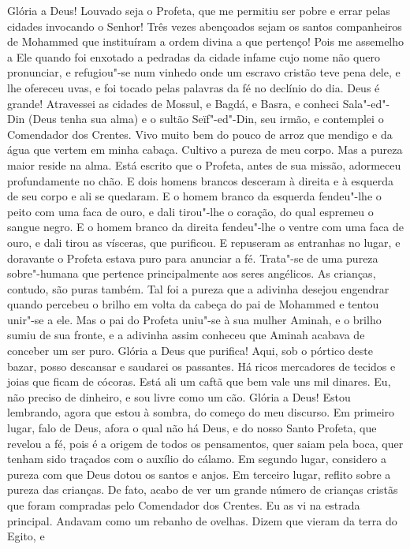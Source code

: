 Glória a Deus!  Louvado seja o Profeta, que me permitiu ser pobre e errar
pelas cidades invocando o Senhor! Três vezes abençoados sejam os santos
companheiros de Mohammed que instituíram a ordem divina a que pertenço!
Pois me assemelho a Ele quando foi enxotado a pedradas da cidade infame
cujo nome não quero pronunciar, e refugiou"-se num vinhedo onde um escravo
cristão teve pena dele, e lhe ofereceu uvas, e foi tocado pelas palavras
da fé no declínio do dia. Deus é grande! Atravessei as cidades de Mossul,
e Bagdá, e Basra, e conheci Sala"-ed"-Din (Deus tenha sua alma) e o sultão
Seïf"-ed"-Din, seu irmão, e contemplei o Comendador dos Crentes. Vivo muito
bem do pouco de arroz que mendigo e da água que vertem em minha cabaça.
Cultivo a pureza de meu corpo. Mas a pureza maior reside na alma. Está
escrito que o Profeta, antes de sua missão, adormeceu profundamente no
chão. E dois homens brancos desceram à direita e à esquerda de seu corpo e
ali se quedaram. E o homem branco da esquerda fendeu"-lhe o peito com uma
faca de ouro, e dali tirou"-lhe o coração, do qual espremeu o sangue negro.
E o homem branco da direita fendeu"-lhe o ventre com uma faca de ouro, e
dali tirou as vísceras, que purificou. E repuseram as entranhas no lugar, e
doravante o Profeta estava puro para anunciar a fé. Trata"-se de uma pureza
sobre"-humana que pertence principalmente aos seres angélicos. As crianças,
contudo, são puras também. Tal foi a pureza que a adivinha desejou
engendrar quando percebeu o brilho em volta da cabeça do pai de Mohammed e
tentou unir"-se a ele. Mas o pai do Profeta uniu"-se à sua mulher Aminah, e
o brilho sumiu de sua fronte, e a adivinha assim conheceu que Aminah
acabava de conceber um ser puro. Glória a Deus que purifica! Aqui, sob o
pórtico deste bazar, posso descansar e saudarei os passantes. Há ricos
mercadores de tecidos e joias que ficam de cócoras. Está ali um caftã que
bem vale uns mil dinares. Eu, não preciso de dinheiro, e sou livre como um
cão. Glória a Deus! Estou lembrando, agora que estou à sombra, do começo
do meu discurso. Em primeiro lugar, falo de Deus, afora o qual não há
Deus, e do nosso Santo Profeta, que revelou a fé, pois é a origem de todos
os pensamentos, quer saiam pela boca, quer tenham sido traçados com o
auxílio do cálamo. Em segundo lugar, considero a pureza com que Deus dotou
os santos e anjos. Em terceiro lugar, reflito sobre a pureza das crianças.
De fato, acabo de ver um grande número de crianças cristãs que foram
compradas pelo Comendador dos Crentes. Eu as vi na estrada principal.
Andavam como um rebanho de ovelhas. Dizem que vieram da terra do Egito, e
